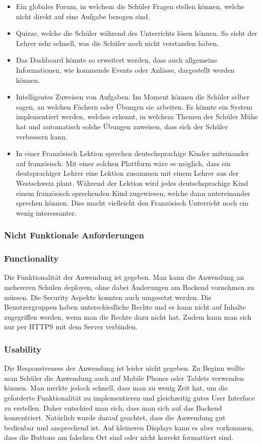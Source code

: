 \begin{itemize}
	\item Ein globales Forum, in welchem die Schüler Fragen stellen können, welche nicht direkt auf eine Aufgabe bezogen sind.
	\item Quizze, welche die Schüler während des Unterrichts lösen können. So sieht der Lehrer sehr schnell, was die Schüler noch nicht verstanden haben.
	\item Das Dashboard könnte so erweitert werden, dass auch allgemeine Informationen, wie kommende Events oder Anlässe, dargestellt werden können.
	\item Intelligentes Zuweisen von Aufgaben. Im Moment können die Schüler selber sagen, an welchen Fächern oder Übungen sie arbeiten. Es könnte ein System implementiert werden, welches erkennt, in welchem Themen der Schüler Mühe hat und automatisch solche Übungen zuweisen, dass sich der Schüler verbessern kann.
	\item In einer Französisch Lektion sprechen deutschsprachige Kinder miteinander auf französisch.	Mit einer solchen Plattform wäre es möglich, dass ein deutsprachiger Lehrer eine Lektion zusammen mit einem Lehrer aus der Westschweiz plant. Während der Lektion wird jedes deutschsprachige Kind einem französisch sprechenden Kind zugewiesen, welche dann untereinander sprechen können. Dies macht vielleicht den Französisch Unterricht noch ein wenig interessanter.
\end{itemize}


\subsubsection{Nicht Funktionale Anforderungen}

\subsubsection*{Functionality}
Die Funktionalität der Anwendung ist gegeben. Man kann die Anwendung an mehereren Schulen deployen, ohne dabei Änderungen am Backend vornehmen zu müssen. Die Security Aspekte konnten auch umgesetzt werden. Die Benutzergruppen haben unterschiedliche Rechte und es kann nicht auf Inhalte zugegriffen werden, wenn man die Rechte dazu nicht hat. Zudem kann man sich nur per HTTPS mit dem Server verbinden.

\subsubsection*{Usability}
Die Responsiveness der Anwendung ist leider nicht gegeben. Zu Beginn wollte man Schüler die Anwendung auch auf Mobile Phones oder Tablets verwenden können. Man merkte jedoch schnell, dass man zu wenig Zeit hat, um die geforderte Funktionalität zu implementieren und gleichzeitig gutes User Interface zu erstellen. Daher entschied man sich, dass man sich auf das Backend konzentriert. Natürlich wurde darauf geachtet, dass die Anwendung gut bedienbar und ansprechend ist. Auf kleineren Displays kann es aber vorkommen, dass die Buttons am falschen Ort sind oder nicht korrekt formattiert sind.

